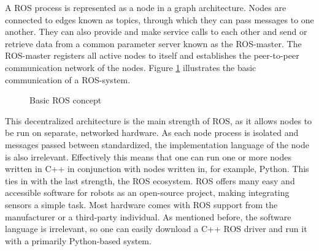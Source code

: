 A ROS process is represented as a node in a graph architecture. Nodes are connected to edges known as topics, through which they can pass messages to one another. They can also provide and make service calls to each other and send or retrieve data from a common parameter server known as the ROS-master. The ROS-master registers all active nodes to itself and establishes the peer-to-peer communication network of the nodes. Figure \ref{fig:ros-arch} illustrates the basic communication of a ROS-system.

\begin{figure}[H]
    \centering
    \caption{Basic ROS concept}
    \label{fig:ros-arch}
\end{figure}

This decentralized architecture is the main strength of ROS, as it allows nodes to be run on separate, networked hardware. As each node process is isolated and messages passed between standardized, the implementation language of the node is also irrelevant. Effectively this means that one can run one or more nodes written in C++ in conjunction with nodes written in, for example, Python. This ties in with the last strength, the ROS ecosystem. ROS offers many easy and accessible software for robots as an open-source project, making integrating sensors a simple task. Most hardware comes with ROS support from the manufacturer or a third-party individual. As mentioned before, the software language is irrelevant, so one can easily download a C++ ROS driver and run it with a primarily Python-based system.

